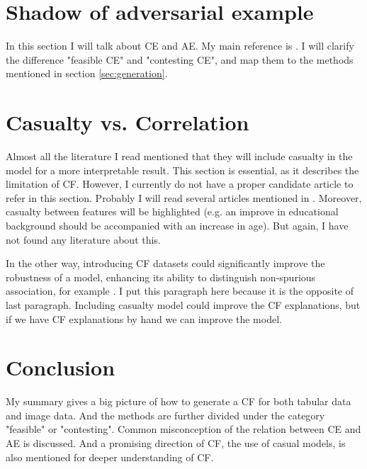 \section{Shadow of adversarial example}\label{sec:adversarial}
In this section I will talk about CE and AE. My main reference is \cite{freiesleben2020counterfactual}. I will clarify the difference "feasible CE" and "contesting CE", and map them to the methods mentioned in section \ref{sec:generation}.
\section{Casualty vs. Correlation}\label{sec:Causualty}
Almost all the literature I read mentioned that they will include casualty in the model for a more interpretable result. This section is essential, as it describes the limitation of CF. 
However, I currently do not have a proper candidate article to refer in this section. Probably I will read several articles mentioned in \cite{freiesleben2020counterfactual}. Moreover, casualty between features will be highlighted (e.g. an improve in educational background should be accompanied with an increase in age). But again, I have not found any literature about this.

In the other way, introducing CF datasets could significantly improve the robustness of a model, enhancing its ability to distinguish non-spurious association, for example \cite{kaushik2019learning}. I put this paragraph here because it is the opposite of last paragraph. Including casualty model could improve the CF explanations, but if we have CF explanations by hand we can improve the model.
\section{Conclusion}\label{sec:Conclude} 
My summary gives a big picture of how to generate a CF for both tabular data and image data. And the methods are further divided under the category "feasible" or "contesting". Common misconception of the relation between CE and AE is discussed. And a promising direction of CF, the use of casual models, is also mentioned for deeper understanding of CF.   